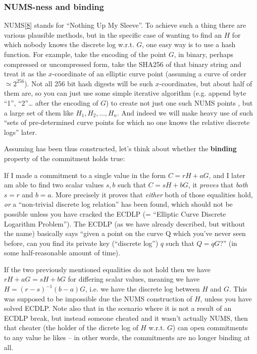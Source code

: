 \documentclass[10pt,a4paper]{article}
\begin{document}
\hypertarget{nums-ness-and-binding}{%
\subsubsection[NUMS-ness and
binding]{\texorpdfstring{\protect\hypertarget{anchor-16}{}{}NUMS-ness
and binding}{NUMS-ness and binding}}\label{nums-ness-and-binding}}

NUMS{[}\protect\hyperlink{anchor-17}{8}{]} stands for ``Nothing Up My
Sleeve''. To achieve such a thing there are various plausible methods,
but in the specific case of wanting to find an $H$ for which nobody knows
the discrete log w.r.t. $G$, one easy way is to use a hash function. For
example, take the encoding of the point $G$, in binary, perhaps compressed
or uncompressed form, take the SHA256 of that binary string and treat it
as the $x$-coordinate of an elliptic curve point (assuming a curve of order
$\simeq 2^256$). Not all 256 bit hash digests will be such $x$-coordinates, but about
half of them are, so you can just use some simple iterative algorithm
(e.g. append byte ``1'', ``2''\ldots{} after the encoding of $G$) to create
not just one such NUMS points , but a large set of them like $H_1, H_2,\ldots ,H_n$. And
indeed we will make heavy use of such ``sets of pre-determined curve
points for which no one knows the relative discrete logs'' later.

Assuming has been thus constructed, let's think about whether the
\textbf{binding} property of the commitment holds true:

If I made a commitment to a single value in the form $C=rH + aG$, and I later am
able to find two scalar values $s, b$ such that $C=sH+bG$, it \emph{proves }that
\emph{both} $s=r$ and $b=a$. More precisely it proves that \emph{either }both of
those equalities hold, \emph{or }a ``non-trivial discrete log relation''
has been found, which should not be possible unless you have cracked the
ECDLP (= ``Elliptic Curve Discrete Logarithm Problem''). The ECDLP (as
we have already described, but without the name) basically says ``given
a point on the curve Q which you've never seen before, can you find its
private key (``discrete log'') $q$ such that $Q=qG$?'' (in some half-reasonable
amount of time).

If the two previously mentioned equalities do not hold then we have $rH + aG = sH+bG$ for
differing scalar values, meaning we have $H = \left(r-s\right)^{-1}(b-a)G$, i.e. we have the discrete log
between $H$ and $G$. This was supposed to be impossible due the NUMS
construction of $H$, unless you have solved ECDLP. Note also that in the
scenario where it is not a result of an ECDLP break, but instead someone
cheated and it wasn't actually NUMS, then that cheater (the holder of
the dicrete log of $H$ w.r.t. $G$) can open commitments to any value he likes
-- in other words, the commitments are no longer binding at all.
\end{document}
